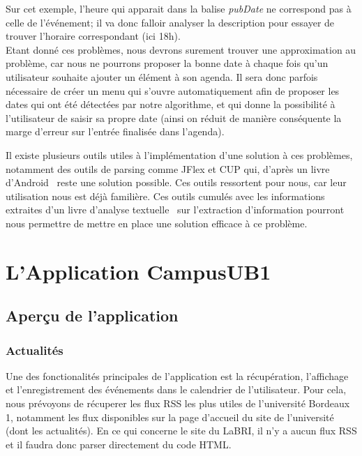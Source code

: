 \documentclass [pdftex,12pt] {report}
\def\wl{\par \vspace{\baselineskip}}
\begin{document}
\wl Sur cet exemple, l'heure qui apparait dans la balise \emph{pubDate} ne correspond pas à celle de l'événement; il va donc falloir analyser la description pour essayer de trouver l'horaire correspondant (ici 18h). \\

Etant donné ces problèmes, nous devrons surement trouver une approximation au problème, car nous ne pourrons proposer la bonne date à chaque fois qu'un utilisateur souhaite ajouter un élément à son agenda. Il sera donc parfois nécessaire de créer un menu qui s'ouvre automatiquement afin de proposer les dates qui ont été détectées par notre algorithme, et qui donne la possibilité à l'utilisateur de saisir sa propre date (ainsi on réduit de manière conséquente la marge d'erreur sur l'entrée finalisée dans l'agenda).
\wl Il existe plusieurs outils utiles à l'implémentation d'une solution à ces problèmes, notamment des outils de parsing comme JFlex et CUP qui, d'après un livre d'Android~\cite{ProgAndroid} reste une solution possible. Ces outils ressortent pour nous, car leur utilisation nous est déjà familière. Ces outils cumulés avec les informations extraites d'un livre d'analyse textuelle~\cite{analyseTextuelle} sur l'extraction d'information pourront nous permettre de mettre en place une solution efficace à ce problème.\\


\chapter{L'Application CampusUB1}
\section{Aperçu de l'application}

\subsection{Actualités}
Une des fonctionalités principales de l'application est la récupération, l'affichage et l'enregistrement des événements dans le calendrier de l'utilisateur. 
Pour cela, nous prévoyons de récuperer les flux RSS les plus utiles de l'université Bordeaux 1\cite{fluxBDX1}, notamment les flux disponibles sur la page d'accueil du site de l'université (dont les actualités).
En ce qui concerne le site du LaBRI, il n'y a aucun flux RSS et il faudra donc parser directement du code HTML.
\end{document}
